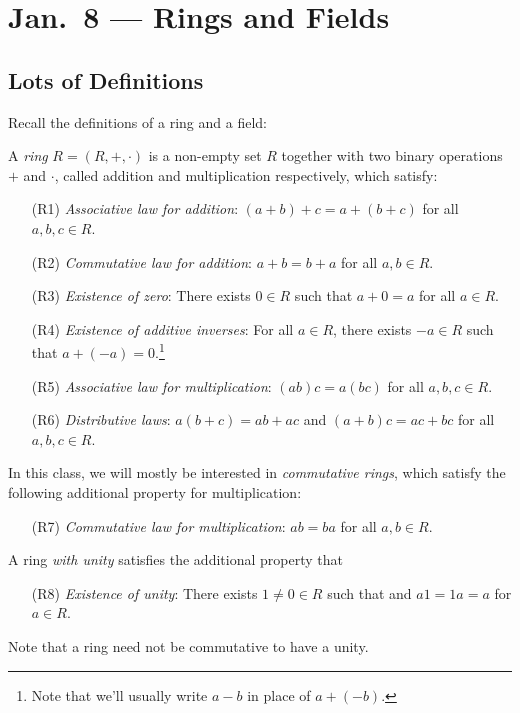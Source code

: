 \chapter{Jan.~8 --- Rings and Fields}

\section{Lots of Definitions}
Recall the definitions of a ring and a field:
\begin{definition}[Ring]
  A \emph{ring} $R = (R, +, \cdot)$ is a non-empty set
  $R$ together with two binary operations
  $+$ and $\cdot$, called addition and multiplication
  respectively, which satisfy:
  \begin{enumerate}
    \item[(R1)] \textit{Associative law for addition}:
      $(a + b) + c = a + (b + c)$ for all $a, b, c \in R$.
    \item[(R2)] \textit{Commutative law for addition}:
      $a + b = b + a$ for all $a, b \in R$.
    \item[(R3)] \textit{Existence of zero}: There exists $0 \in R$ such that
      $a + 0 = a$ for all $a \in R$.
    \item[(R4)] \textit{Existence of additive inverses}:
      For all $a \in R$, there exists $-a \in R$ such that
      $a + (-a) = 0$.\footnote{Note that we'll usually write $a - b$ in place of $a + (-b)$.}
    \item[(R5)] \textit{Associative law for multiplication}:
      $(ab)c = a(bc)$ for all $a, b, c \in R$.
    \item[(R6)] \textit{Distributive laws}:
      $a(b + c) = ab + ac$ and $(a + b)c = ac + bc$ for all $a, b, c \in R$.
  \end{enumerate}
\end{definition}

\begin{definition}
In this class, we will mostly be interested in
\emph{commutative rings}, which satisfy the following
additional property for multiplication:
\begin{enumerate}
  \item[(R7)] \textit{Commutative law for multiplication}:
    $ab = ba$ for all $a, b \in R$.
\end{enumerate}
\end{definition}

\begin{definition}
A ring \emph{with unity} satisfies the additional
property that
\begin{enumerate}
  \item[(R8)] \emph{Existence of unity}: There exists
    $1 \ne 0 \in R$ such that and
    $a 1 = 1 a = a$ for $a \in R$.
\end{enumerate}
\end{definition}
Note that a ring need not be commutative to have a unity.

